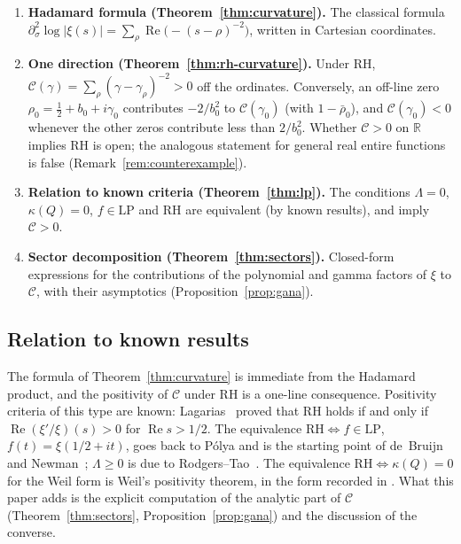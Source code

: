 \documentclass[11pt]{amsart}
\renewcommand{\Re}{\operatorname{Re}}
\newcommand{\LP}{\mathrm{LP}}
\begin{document}
\begin{enumerate}
  \item \textbf{Hadamard formula (Theorem~\ref{thm:curvature}).} The classical formula
    $\partial^2_{\sigma}\log|\xi(s)|=\sum_\rho\Re\bigl(-(s-\rho)^{-2}\bigr)$, written in
    Cartesian coordinates.
  \item \textbf{One direction (Theorem~\ref{thm:rh-curvature}).} Under RH,
    $\mathcal C(\gamma)=\sum_\rho(\gamma-\gamma_\rho)^{-2}>0$ off the ordinates. Conversely, an
    off-line zero $\rho_0=\tfrac12+b_0+i\gamma_0$ contributes $-2/b_0^2$ to $\mathcal C(\gamma_0)$
    (with $1-\bar\rho_0$), and $\mathcal C(\gamma_0)<0$ whenever the other zeros contribute
    less than $2/b_0^2$. Whether $\mathcal C>0$ on $\mathbb R$ implies RH is open; the
    analogous statement for general real entire functions is false
    (Remark~\ref{rem:counterexample}).
  \item \textbf{Relation to known criteria (Theorem~\ref{thm:lp}).} The conditions
    $\Lambda=0$, $\kappa(Q)=0$, $f\in\LP$ and RH are equivalent (by known results), and imply
    $\mathcal C>0$.
  \item \textbf{Sector decomposition (Theorem~\ref{thm:sectors}).} Closed-form expressions for
    the contributions of the polynomial and gamma factors of $\xi$ to $\mathcal C$, with
    their asymptotics (Proposition~\ref{prop:gana}).
\end{enumerate}

\subsection*{Relation to known results}

The formula of Theorem~\ref{thm:curvature} is immediate from the Hadamard product, and the
positivity of $\mathcal C$ under RH is a one-line consequence. Positivity criteria of this
type are known: Lagarias~\cite{Lagarias1999} proved that RH holds if and only if
$\Re(\xi'/\xi)(s)>0$ for $\Re s>1/2$. The equivalence $\mathrm{RH}\iff f\in\LP$, $f(t)=\xi(1/2+it)$,
goes back to P\'olya and is the starting point of de~Bruijn~\cite{deBruijn1950} and
Newman~\cite{Newman1976}; $\Lambda \geq 0$ is due to Rodgers--Tao~\cite{RodgersTao2020}.
The equivalence $\mathrm{RH}\iff\kappa(Q)=0$ for the Weil form is Weil's positivity theorem,
in the form recorded in \cite[Thm.~2.2, Def.~2.3]{P25}. What this paper adds is the explicit
computation of the analytic part of $\mathcal C$ (Theorem~\ref{thm:sectors},
Proposition~\ref{prop:gana}) and the discussion of the converse.
\end{document}
